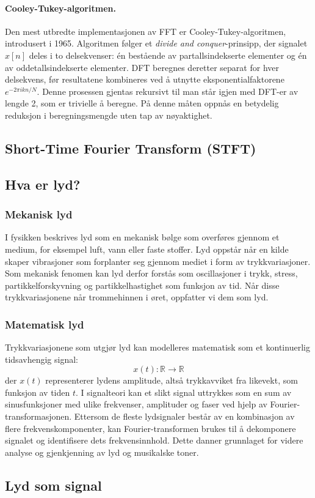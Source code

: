 \paragraph{Cooley-Tukey-algoritmen.} 
Den mest utbredte implementasjonen av FFT er Cooley-Tukey-algoritmen, introdusert i 1965. 
Algoritmen følger et \textit{divide and conquer}-prinsipp, der signalet $x[n]$ deles i to delsekvenser: én bestående av partallsindekserte elementer og én av oddetallsindekserte elementer. 
DFT beregnes deretter separat for hver delsekvens, før resultatene kombineres ved å utnytte eksponentialfaktorene $e^{-2\pi i kn/N}$. 
Denne prosessen gjentas rekursivt til man står igjen med DFT-er av lengde 2, som er trivielle å beregne. 
På denne måten oppnås en betydelig reduksjon i beregningsmengde uten tap av nøyaktighet.




\subsection{Short-Time Fourier Transform (STFT)}

\subsection{Hva er lyd?}

\subsubsection{Mekanisk lyd}
I fysikken beskrives lyd som en mekanisk bølge som overføres gjennom et medium, for eksempel luft, vann eller faste stoffer. 
Lyd oppstår når en kilde skaper vibrasjoner som forplanter seg gjennom mediet i form av trykkvariasjoner. 
Som mekanisk fenomen kan lyd derfor forstås som oscillasjoner i trykk, stress, partikkelforskyvning og partikkelhastighet som funksjon av tid. 
Når disse trykkvariasjonene når trommehinnen i øret, oppfatter vi dem som lyd.

\subsubsection{Matematisk lyd}
Trykkvariasjonene som utgjør lyd kan modelleres matematisk som et kontinuerlig tidsavhengig signal:
\[
x(t): \mathbb{R} \rightarrow \mathbb{R}
\]
der $x(t)$ representerer lydens amplitude, altså trykkavviket fra likevekt, som funksjon av tiden $t$. 
I signalteori kan et slikt signal uttrykkes som en sum av sinusfunksjoner med ulike frekvenser, amplituder og faser ved hjelp av Fourier-transformasjonen. 
Ettersom de fleste lydsignaler består av en kombinasjon av flere frekvenskomponenter, kan Fourier-transformen brukes til å dekomponere signalet og identifisere dets frekvensinnhold. 
Dette danner grunnlaget for videre analyse og gjenkjenning av lyd og musikalske toner.

\subsection{Lyd som signal}
